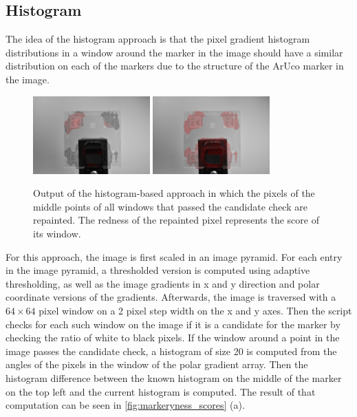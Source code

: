 \documentclass[10pt]{book}
\newcommand{\figurereft}[2]{\autoref{#1} #2}
\begin{document}
\subsection{Histogram}

The idea of the histogram approach is that the pixel gradient histogram distributions in a window around the marker in the image should have a similar distribution on each of the markers due to the structure of the \ac{ArUco} marker in the image.

\begin{figure}
  \centering
     {\includegraphics[width=0.4\textwidth]{image/classic_hist_markerynesses}}
     {\includegraphics[width=0.4\textwidth]{image/classic_markeryness}}
  \caption{Output of the histogram-based approach in which the pixels of the middle points of all windows that passed the candidate check are repainted. The redness of the repainted pixel represents the score of its window.}
  \label{fig:markeryness_scores}
\end{figure}

For this approach, the image is first scaled in an image pyramid. For each entry in the image pyramid, a thresholded version is computed using adaptive thresholding, as well as the image gradients in x and y direction and polar coordinate versions of the gradients. Afterwards, the image is traversed with a $64 \times 64$ pixel window on a 2 pixel step width on the x and y axes. Then the script checks for each such window on the image if it is a candidate for the marker by checking the ratio of white to black pixels. If the window around a point in the image passes the candidate check, a histogram of size 20 is computed from the angles of the pixels in the window of the polar gradient array. Then the histogram difference between the known histogram on the middle of the marker on the top left and the current histogram is computed. The result of that computation can be seen in \figurereft{fig:markeryness_scores}{(a)}. 
\end{document}
